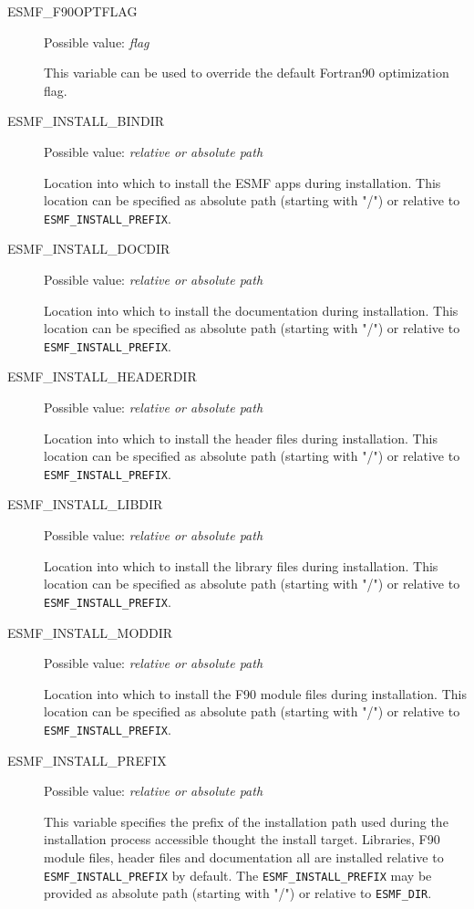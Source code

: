 \begin{description}
\item[ESMF\_F90OPTFLAG]
Possible value: {\em flag}

This variable can be used to override the default  Fortran90 optimization flag.

\item[ESMF\_INSTALL\_BINDIR]
Possible value: {\em relative or absolute path}

Location into which to install the ESMF apps during installation. This
location can be specified as absolute path (starting with "/") or relative to
{\tt ESMF\_INSTALL\_PREFIX}.

\item[ESMF\_INSTALL\_DOCDIR]
Possible value: {\em relative or absolute path}

Location into which to install the documentation during installation. This
location can be specified as absolute path (starting with "/") or relative to
{\tt ESMF\_INSTALL\_PREFIX}.

\item[ESMF\_INSTALL\_HEADERDIR]
Possible value: {\em relative or absolute path}

Location into which to install the header files during installation. This
location can be specified as absolute path (starting with "/") or relative to
{\tt ESMF\_INSTALL\_PREFIX}.

\item[ESMF\_INSTALL\_LIBDIR]
Possible value: {\em relative or absolute path}

Location into which to install the library files during installation. This
location can be specified as absolute path (starting with "/") or relative to
{\tt ESMF\_INSTALL\_PREFIX}.

\item[ESMF\_INSTALL\_MODDIR]
Possible value: {\em relative or absolute path}

Location into which to install the F90 module files during installation. This
location can be specified as absolute path (starting with "/") or relative to
{\tt ESMF\_INSTALL\_PREFIX}.

\item[ESMF\_INSTALL\_PREFIX]
Possible value: {\em relative or absolute path}

This variable specifies the prefix of the installation path used during the
installation process accessible thought the install target. Libraries, F90
module files, header files and documentation all are installed relative to
{\tt ESMF\_INSTALL\_PREFIX} by default. The {\tt ESMF\_INSTALL\_PREFIX} may be
provided as absolute path (starting with "/") or relative to {\tt ESMF\_DIR}.


\end{description}
